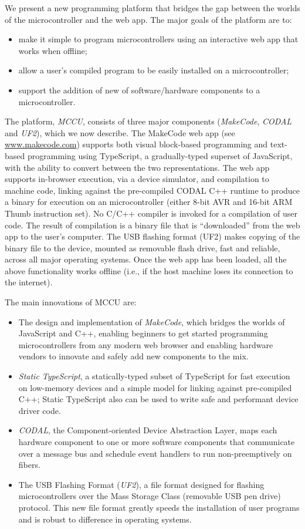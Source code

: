 We present a new programming platform that bridges the gap between the worlds of the microcontroller
and the web app. The major goals of the platform are to:
\begin{itemize}
\item make it simple to program microcontrollers using an interactive web app that works when offline;
\item allow a user's compiled program to be easily installed on a microcontroller;
\item support the addition of new of software/hardware components to a microcontroller.
\end{itemize}
The platform, \emph{MCCU}, consists of three major components (\emph{MakeCode}, \emph{CODAL} and \emph{UF2}), which we now describe. 
The MakeCode web app (see \url{www.makecode.com}) supports both visual block-based programming and text-based programming 
using TypeScript, a gradually-typed superset of JavaScript, with the ability to convert between the two representations. 
The web app supports in-browser execution, via a device simulator, and compilation to machine code, linking against the 
pre-compiled CODAL C++ runtime to produce a binary for execution on an microcontroller (either 8-bit AVR and 16-bit ARM 
Thumb instruction set). No C/C++ compiler is invoked for a compilation of user code. The result of compilation is a 
binary file that is ``downloaded'' from the web app to the user's computer. The USB flashing format (UF2) makes copying 
of the binary file to the device, mounted as removable flash drive, fast and reliable, across all major operating systems. 
Once the web app has been loaded, all the above functionality works offline (i.e., if the host machine loses its connection 
to the internet).

The main innovations of MCCU are:
\begin{itemize}
\item The design and implementation of \emph{MakeCode}, which bridges the worlds of JavaScript and C++, 
      enabling beginners to get started programming microcontrollers from any modern web browser and enabling 
      hardware vendors to innovate and safely add new components to the mix. 
\item \emph{Static TypeScript}, a statically-typed subset of TypeScript for fast execution on low-memory devices and a simple model for linking against pre-compiled C++; Static TypeScript also can be used to write safe and performant device driver code.
\item \emph{CODAL}, the Component-oriented Device Abstraction Layer, maps each hardware component to one or more software components that communicate over a message bus and schedule event handlers to run non-preemptively on fibers. 
\item The USB Flashing Format (\emph{UF2}), a file format designed for flashing microcontrollers over the Mass Storage Class (removable USB pen drive) protocol.  This new file format greatly speeds the installation of user programs and is robust to difference in operating systems.
\end{itemize}

